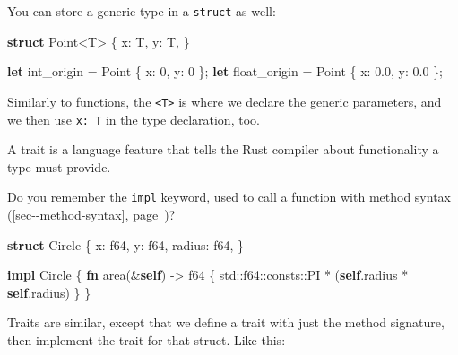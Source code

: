 \documentclass[a4paper,]{book}
\renewcommand*{\hyperref}[2][\ar]{%
  \def\ar{#2}%
  #2 (\autoref{#1}, page~\pageref{#1})}
\newenvironment{Shaded}{\begin{snugshade}}{\end{snugshade}}
\newcommand{\KeywordTok}[1]{\textcolor[rgb]{0.13,0.29,0.53}{\textbf{{#1}}}}
\newcommand{\DataTypeTok}[1]{\textcolor[rgb]{0.13,0.29,0.53}{{#1}}}
\newcommand{\DecValTok}[1]{\textcolor[rgb]{0.00,0.00,0.81}{{#1}}}
\newcommand{\NormalTok}[1]{{#1}}
\begin{document}
You can store a generic type in a \texttt{struct} as well:

\begin{Shaded}
\begin{Highlighting}[]
\KeywordTok{struct} \NormalTok{Point<T> \{}
    \NormalTok{x: T,}
    \NormalTok{y: T,}
\NormalTok{\}}

\KeywordTok{let} \NormalTok{int_origin = Point \{ x: }\DecValTok{0}\NormalTok{, y: }\DecValTok{0} \NormalTok{\};}
\KeywordTok{let} \NormalTok{float_origin = Point \{ x: }\DecValTok{0.0}\NormalTok{, y: }\DecValTok{0.0} \NormalTok{\};}
\end{Highlighting}
\end{Shaded}

Similarly to functions, the \texttt{\textless{}T\textgreater{}} is where
we declare the generic parameters, and we then use \texttt{x:\ T} in the
type declaration, too.


A trait is a language feature that tells the Rust compiler about
functionality a type must provide.

Do you remember the \texttt{impl} keyword, used to call a function with
\hyperref[sec--method-syntax]{method syntax}?

\begin{Shaded}
\begin{Highlighting}[]
\KeywordTok{struct} \NormalTok{Circle \{}
    \NormalTok{x: }\DataTypeTok{f64}\NormalTok{,}
    \NormalTok{y: }\DataTypeTok{f64}\NormalTok{,}
    \NormalTok{radius: }\DataTypeTok{f64}\NormalTok{,}
\NormalTok{\}}

\KeywordTok{impl} \NormalTok{Circle \{}
    \KeywordTok{fn} \NormalTok{area(&}\KeywordTok{self}\NormalTok{) -> }\DataTypeTok{f64} \NormalTok{\{}
        \NormalTok{std::}\DataTypeTok{f64}\NormalTok{::consts::PI * (}\KeywordTok{self}\NormalTok{.radius * }\KeywordTok{self}\NormalTok{.radius)}
    \NormalTok{\}}
\NormalTok{\}}
\end{Highlighting}
\end{Shaded}

Traits are similar, except that we define a trait with just the method
signature, then implement the trait for that struct. Like this:
\end{document}

